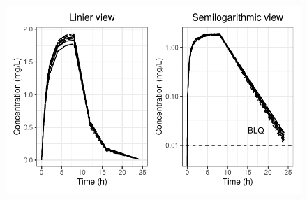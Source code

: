 \documentclass[
  letterpaper,
  DIV=11,
  numbers=noendperiod]{scrreprt}
\begin{document}
\begin{figure}[H]

{\centering \includegraphics{output_flow_files/figure-pdf/nca3-1.pdf}

}

\end{figure}
\end{document}
